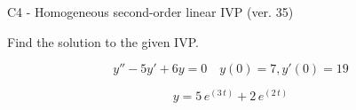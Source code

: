 \begin{exercise}
  \begin{exerciseTitle}C4 - Homogeneous second-order linear IVP (ver. 35)\end{exerciseTitle}
  \begin{exerciseStatement}
    
Find the solution to the given IVP.

    
\[y''-5y'+6y = 0 \hspace{1em} y(0) = 7 , y'(0) = 19\]

  \end{exerciseStatement}
  \begin{exerciseAnswer}
    
\[y= 5 \, e^{\left(3 \, t\right)} + 2 \, e^{\left(2 \, t\right)}\]

  \end{exerciseAnswer}
\end{exercise}